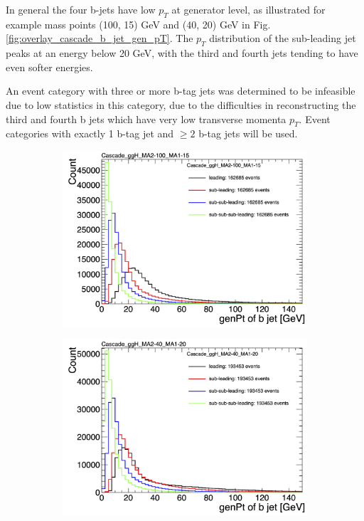 In general the four b-jets have low $p_{T}$ at generator level, as illustrated for example mass points (100, 15) GeV and (40, 20) GeV in Fig. \ref{fig:overlay_cascade_b_jet_gen_pT}. The $p_{T}$ distribution of the sub-leading jet peaks at an energy below 20 GeV, with the third and fourth jets tending to have even softer energies.

An event category with three or more b-tag jets was determined to be infeasible due to low statistics in this category, due to the difficulties in reconstructing the third and fourth b jets which have very low transverse momenta $p_{T}$. Event categories with exactly 1 b-tag jet and $\geq 2$ b-tag jets will be used.

\begin{figure}[h]
    \centering
    \begin{subfigure}{0.45\textwidth}
        \includegraphics[width=1.0\textwidth]{figures/ch-11-asymmetric/Cascade_ggH_MA2-100_MA1-15_overlay}
    \end{subfigure}
    \hfill
    \begin{subfigure}{0.45\textwidth}
        \includegraphics[width=1.0\textwidth]{figures/ch-11-asymmetric/Cascade_ggH_MA2-40_MA1-20_overlay}

\end{subfigure}
\end{figure}

